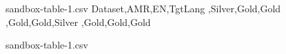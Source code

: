 \documentclass[12pt, onecolumn, oneside, a4paper, hidelinks]{report}
\begin{document}
\begin{filecontents*}{sandbox-table-1.csv}
  Dataset,AMR,EN,TgtLang
  ,Silver,Gold,Gold
  ,Gold,Gold,Silver
  ,Gold,Gold,Gold
\end{filecontents*}
  {sandbox-table-1.csv}
  {}
\end{document}
